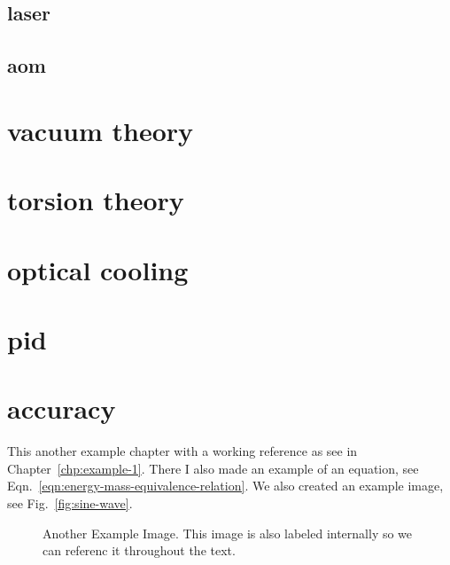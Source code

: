\documentclass[\main/master.tex]{subfiles}
\begin{document}
\subsection{laser}
\subsection{aom}
\section{vacuum theory}
\section{torsion theory}
\section{optical cooling}
\section{pid}
\section{accuracy}
\doublespacing
\hspace{5 mm} This another example chapter with a working reference as see in Chapter~\ref{chp:example-1}. There I also made an example of an equation, see Eqn.~\ref{eqn:energy-mass-equivalence-relation}. We also created an example image, see Fig.~\ref{fig:sine-wave}.
\begin{figure}[htbp]
	\centering
	\caption[Another Example Image]{Another Example Image. This image is also labeled internally so we can referenc it throughout the text.}
	\label{fig:cosine-wave}
\end{figure}
\end{document}
